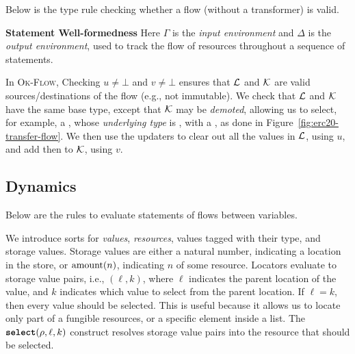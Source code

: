 \documentclass[dvipsnames,runningheads]{llncs}
\begin{document}
Below is the type rule checking whether a flow (without a transformer) is valid.

 \textbf{Statement Well-formedness}
Here $\Gamma$ is the \emph{input environment} and $\Delta$ is the \emph{output environment}, used to track the flow of resources throughout a sequence of statements.

In \textsc{Ok-Flow}, Checking $u \neq \bot$ and $v \neq \bot$ ensures that $\Loc$ and $\LocK$ are valid sources/destinations of the flow (e.g., not immutable).
We check that $\Loc$ and $\LocK$ have the same base type, except that $\LocK$ may be \emph{demoted}, allowing us to select, for example, a , whose \emph{underlying type} is , with a , as done in Figure~\ref{fig:erc20-transfer-flow}.
We then use the updaters to clear out all the values in $\Loc$, using $u$, and add then to $\LocK$, using $v$.
\begin{mathpar}
\end{mathpar}

\subsection{Dynamics}

Below are the rules to evaluate statements of flows between variables.

We introduce sorts for \emph{values}, \emph{resources}, values tagged with their type, and storage values.
Storage values are either a natural number, indicating a location in the store, or $\amount(n)$, indicating $n$ of some resource.
Locators evaluate to storage value pairs, i.e., $(\ell, k)$, where $\ell$ indicates the parent location of the value, and $k$ indicates which value to select from the parent location.
If $\ell = k$, then every value should be selected.
This is useful because it allows us to locate only part of a fungible resources, or a specific element inside a list.
The $\select(\rho, \ell, k)$ construct resolves storage value pairs into the resource that should be selected.
\end{document}
